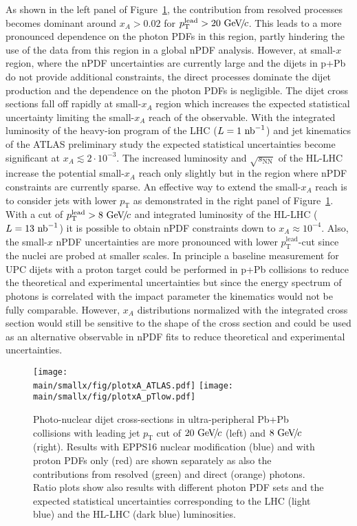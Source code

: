 \documentclass[../report.tex]{subfiles}
\providecommand{\main}{..}
\begin{document}
As shown in the left panel of Figure~\ref{fig:UPCdijetNPDF}, the contribution from resolved processes becomes dominant around $x_A > 0.02$ for $p_{\mathrm{T}}^{\mathrm{lead}}>20~\text{GeV}\!/\mspace{-2mu}c$. This leads to a more pronounced dependence on the photon PDFs in this region, partly hindering the use of the data from this region in a global nPDF analysis. However, at small-$x$ region, where the nPDF uncertainties are currently large and the dijets in p+Pb do not provide additional constraints, the direct processes dominate the dijet production and the dependence on the photon PDFs is negligible. The dijet cross sections fall off rapidly at small-$x_A$ region which increases the expected statistical uncertainty limiting the small-$x_A$ reach of the observable. With the integrated luminosity of the heavy-ion program of the LHC ($L=1~\text{nb}^{-1}$) and jet kinematics of the ATLAS preliminary study the expected statistical uncertainties become significant at $x_A \lesssim 2 \cdot 10^{-3}$. The increased luminosity and $\sqrt{s_{\mathrm{NN}}}$ of the HL-LHC increase the potential small-$x_A$ reach only slightly but in the region where nPDF constraints are currently sparse. An effective way to extend the small-$x_A$ reach is to consider jets with lower $p_{\mathrm{T}}$ as demonstrated in the right panel of Figure~\ref{fig:UPCdijetNPDF}. With a cut of $p_{\mathrm{T}}^{\mathrm{lead}}>8~\text{GeV}\!/\mspace{-2mu}c$ and integrated luminosity of the HL-LHC ($L=13~\text{nb}^{-1}$) it is possible to obtain nPDF constraints down to $x_A \approx 10^{-4}$.  Also, the small-$x$ nPDF uncertainties are more pronounced with lower $p_{\mathrm{T}}^{\mathrm{lead}}$-cut since the nuclei are probed at smaller scales. In principle a baseline measurement for UPC dijets with a proton target could be performed in p+Pb collisions to reduce the theoretical and experimental uncertainties but since the energy spectrum of photons is correlated with the impact parameter the kinematics would not be fully comparable. However, $x_A$ distributions normalized with the integrated cross section would still be sensitive to the shape of the cross section and could be used as an alternative observable in nPDF fits to reduce theoretical and experimental uncertainties.

\begin{figure}
\texttt{[image: \\main/smallx/fig/plotxA\_ATLAS.pdf]}
\texttt{[image: \\main/smallx/fig/plotxA\_pTlow.pdf]}
\caption{Photo-nuclear dijet cross-sections in ultra-peripheral Pb+Pb collisions with leading jet $p_{\mathrm{T}}$ cut of $20~\text{GeV}\!/\mspace{-2mu}c$ (left) and $8~\text{GeV}\!/\mspace{-2mu}c$ (right). Results with EPPS16 nuclear modification (blue) and with proton PDFs only (red) are shown separately as also the contributions from resolved (green) and direct (orange) photons. Ratio plots show also results with different photon PDF sets and the expected statistical uncertainties corresponding to the LHC (light blue) and the HL-LHC (dark blue) luminosities.}
\label{fig:UPCdijetNPDF}
\end{figure}
\end{document}
